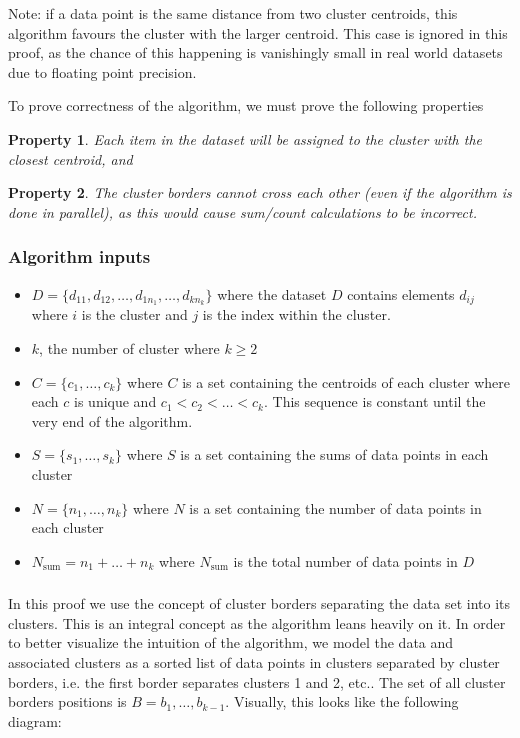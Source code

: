 \documentclass[conference]{IEEEtran}
\newtheorem{prp}{Property}
\begin{document}
Note: if a data point is the same distance from two cluster centroids, this algorithm favours the cluster with the larger centroid.
This case is ignored in this proof, as the chance of this happening is vanishingly small in real world datasets due to floating point precision.

To prove correctness of the algorithm, we must prove the following properties
\begin{prp}\label{closest-centroid}Each item in the dataset will be assigned to the cluster with the closest centroid, and\end{prp}
\begin{prp}\label{border-cross}The cluster borders cannot cross each other (even if the algorithm is done in parallel), as this would cause sum/count calculations to be incorrect.\end{prp}

\subsubsection{Algorithm inputs}
\begin{itemize}
\item $D = \{d_{11}, d_{12}, \dots , d_{1n_1}, \dots, d_{kn_k}\}$ where the dataset $D$ contains elements $d_{ij}$ where $i$ is the cluster and $j$ is the index within the cluster. 
\item $k$, the number of cluster where $k \geq 2$
\item $C = \{c_1, \dots, c_k\}$ where $C$ is a set containing the centroids of each cluster where each $c$ is unique and $c_1 < c_2 < \dots < c_k$. This sequence is constant until the very end of the algorithm.
\item $S = \{s_1, \dots, s_k\}$ where $S$ is a set containing the sums of data points in each cluster
\item $N = \{n_1, \dots, n_k\}$ where $N$ is a set containing the number of data points in each cluster
\item $N_{\text{sum}} = {n_1 + \dots + n_k}$ where $N_{\text{sum}}$ is the total number of data points in $D$
\end{itemize}

\subsubsection{}
In this proof we use the concept of cluster borders separating the data set into its clusters.
This is an integral concept as the algorithm leans heavily on it.
In order to better visualize the intuition of the algorithm, we model the data and associated clusters as a sorted list of data points in clusters separated by cluster borders, i.e. the first border separates clusters 1 and 2, etc.. The set of all cluster borders positions is $B = b_1, \dots, b_{k-1}$. Visually, this looks like the following diagram:
\end{document}
